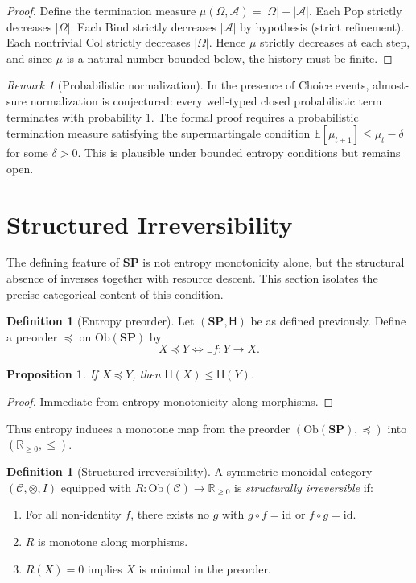 \documentclass[12pt,a4paper]{article}
\newtheorem{proposition}[theorem]{Proposition}
\theoremstyle{definition}
\newtheorem{definition}[theorem]{Definition}
\theoremstyle{remark}
\newtheorem{remark}[theorem]{Remark}
\newcommand{\Ent}{\ensuremath{\mathsf{H}}}
\newcommand{\SP}{\mathbf{SP}}
\newcommand{\Ob}{\mathrm{Ob}}
\providecommand{\id}{\mathrm{id}}
\renewcommand{\id}{\mathrm{id}}
\newcommand{\Pop}{\ensuremath{\mathrm{Pop}}}
\newcommand{\Bind}{\ensuremath{\mathrm{Bind}}}
\newcommand{\Col}{\ensuremath{\mathrm{Col}}}
\begin{document}
\begin{proof}
Define the termination measure $\mu(\Omega,\mathcal{A})=|\Omega|+|\mathcal{A}|$. Each $\Pop$ strictly decreases $|\Omega|$. Each $\Bind$ strictly decreases $|\mathcal{A}|$ by hypothesis (strict refinement). Each nontrivial $\Col$ strictly decreases $|\Omega|$. Hence $\mu$ strictly decreases at each step, and since $\mu$ is a natural number bounded below, the history must be finite.
\end{proof}

\begin{remark}[Probabilistic normalization]
In the presence of Choice events, almost-sure normalization is conjectured: every
well-typed closed probabilistic term terminates with probability 1. The formal proof
requires a probabilistic termination measure satisfying the supermartingale condition
$\mathbb{E}[\mu_{t+1}]\le\mu_t-\delta$ for some $\delta>0$. This is plausible under
bounded entropy conditions but remains open.
\end{remark}

\section{Structured Irreversibility}
\label{sec:structured}

The defining feature of $\SP$ is not entropy monotonicity alone, but the
structural absence of inverses together with resource descent. This
section isolates the precise categorical content of this condition.

\begin{definition}[Entropy preorder]
Let $(\SP,\Ent)$ be as defined previously. Define a preorder
$\preceq$ on $\Ob(\SP)$ by
\[
  X \preceq Y \iff \exists f : Y \to X.
\]
\end{definition}

\begin{proposition}
If $X \preceq Y$, then $\Ent(X) \le \Ent(Y)$.
\end{proposition}

\begin{proof}
Immediate from entropy monotonicity along morphisms.
\end{proof}

Thus entropy induces a monotone map from the preorder $(\Ob(\SP),\preceq)$
into $(\mathbb{R}_{\ge 0},\le)$.

\begin{definition}[Structured irreversibility]
A symmetric monoidal category $(\mathcal{C},\otimes,I)$ equipped with
$R : \Ob(\mathcal{C}) \to \mathbb{R}_{\ge 0}$ is
\emph{structurally irreversible} if:
\begin{enumerate}
  \item For all non-identity $f$, there exists no $g$ with
        $g\circ f=\id$ or $f\circ g=\id$.
  \item $R$ is monotone along morphisms.
  \item $R(X)=0$ implies $X$ is minimal in the preorder.
\end{enumerate}
\end{definition}
\end{document}
